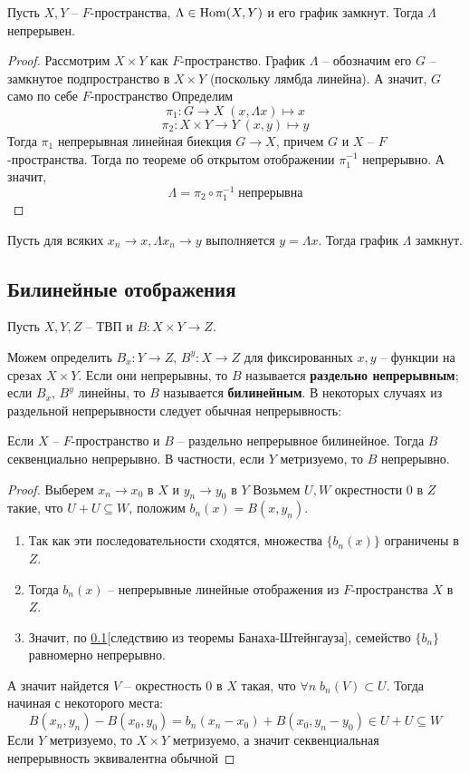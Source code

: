 \documentclass[12pt, a4paper, oneside]{book}
\begin{document}
\begin{theorem}
    Пусть $X,Y$ -- $F$-пространства, $\Lambda \in \operatorname{Hom}(X,Y)$ и его график замкнут. Тогда $\Lambda$ непрерывен.
\end{theorem}

\begin{proof}
    Рассмотрим $X\times Y$ как $F$-пространство.
График $\Lambda$ -- обозначим его $G$ -- замкнутое подпространство в $X\times Y$ (поскольку лямбда линейна). А значит, $G$ само по себе $F$-пространство
    Определим $$\pi_1: G \to X\; (x,\Lambda x) \mapsto x$$
    $$\pi_2: X\times Y \to Y\; (x,y) \mapsto y$$
    Тогда $\pi_1$ непрерывная линейная биекция $G\to X$, причем $G$ и $X$ -- $F$-пространства. Тогда по теореме об открытом отображении $\pi_1^{-1}$ непрерывно. А значит,
     $$\Lambda = \pi_2 \circ \pi_1^{-1} \; \text{непрерывна}$$
\end{proof}

\begin{remark}
Пусть для всяких $x_n \to x, \Lambda x_n \to y$ выполняется $y = \Lambda x$. Тогда график $\Lambda$ замкнут.
\end{remark}

\subsection{Билинейные отображения}
Пусть $X,Y,Z$ -- ТВП и $B: X\times Y \to Z$.

Можем определить $B_x:Y\to Z,\, B^y:X \to Z$ для фиксированных $x,y$ -- функции на срезах $X\times Y$.  Если они непрерывны, то $B$ называется \textbf{раздельно непрерывным}; если $B_x, \, B^y$ линейны, то $B$ называется \textbf{билинейным}.
В некоторых случаях из раздельной непрерывности следует обычная непрерывность:
\begin{theorem}
    Если $X$ -- $F$-пространство и $B$ -- раздельно непрерывное билинейное. Тогда $B$ секвенциально непрерывно. В частности, если $Y$ метризуемо, то $B$ непрерывно.
\end{theorem}
\begin{proof}
    Выберем $x_n \to x_0$ в $X$ и $y_n \to y_0$ в $Y$
Возьмем $U, W$ окрестности 0 в $Z$ такие, что $U+U \subseteq W$, положим $b_n(x) = B(x,y_n)$.
    \begin{enumerate}
        \item  Так как эти последовательности сходятся, множества $\{b_n(x)\}$ ограничены в $Z$.
        \item  Тогда $b_n(x)$ --  непрерывные линейные отображения из $F$-пространства $X$ в $Z$.
        \item  Значит, по \ref{}[следствию из теоремы Банаха-Штейнгауза], семейство $\{b_n\}$ равномерно непрерывно.
    \end{enumerate}
    А значит найдется $V$ -- окрестность 0 в $X$ такая, что $\forall n\; b_n(V) \subset U$. Тогда начиная с некоторого места:
    $$B(x_n, y_n) - B(x_0,y_0) = b_n(x_n-x_0)+B(x_0,y_n-y_0) \in U + U \subseteq W$$
    Если $Y$ метризуемо, то $X\times Y$ метризуемо, а значит секвенциальная непрерывность эквивалентна обычной
\end{proof}
    
    
\end{document}
